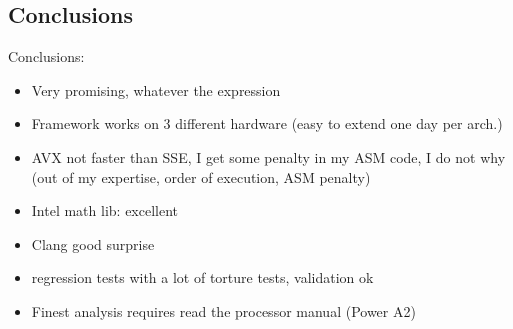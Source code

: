 \documentclass{beamer}
\begin{document}
%
%


\subsection*{Conclusions}
\begin{frame}[fragile]
Conclusions:
\begin{itemize}
\item Very promising, whatever the expression
\item Framework works on 3 different hardware (easy to extend one day per arch.)
\item AVX not faster than SSE, I get some penalty in my ASM code, I do not why (out of my expertise, order of execution, ASM penalty)
\item Intel math lib: excellent
\item Clang good surprise
\item regression tests with a lot of torture tests, validation ok
\item Finest analysis requires read the processor manual (Power A2)
\end{itemize}

\end{frame}
\end{document}
